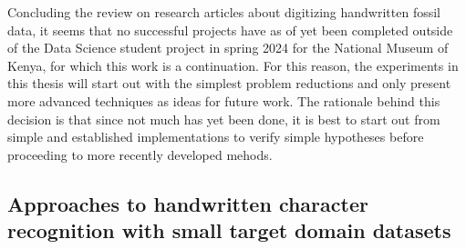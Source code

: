 \documentclass{article}
\begin{document}
Concluding the review on research articles about digitizing handwritten fossil data, it seems that no successful projects
have as of yet been completed outside of the Data Science student project in spring 2024 for the National 
Museum of Kenya, for which this work is a continuation. For this reason, the experiments in this thesis will 
start out with the simplest problem reductions and only present more advanced techniques as ideas for future work.
The rationale behind this decision is that since not much has yet been done, it is best to start out from 
simple and established implementations to verify simple hypotheses before proceeding to more recently developed mehods.

\subsection{Approaches to handwritten character recognition with small target domain datasets}
\label{sect:same_solution}



\end{document}
